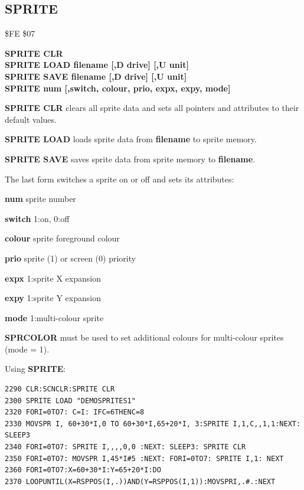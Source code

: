 \subsection{SPRITE}
\begin{description}[leftmargin=2cm,style=nextline]
\item [Token:] \$FE \$07
\item [Format:] {\bf SPRITE CLR} \\
                {\bf SPRITE LOAD filename [,D drive] [,U unit]} \\
                {\bf SPRITE SAVE filename [,D drive] [,U unit]} \\
                {\bf SPRITE num [,switch, colour, prio, expx, expy, mode]}
\item [Usage:]  {\bf SPRITE CLR} clears all sprite data and sets all pointers
                and attributes to their default values.

                {\bf SPRITE LOAD } loads sprite data from {\bf filename}
                to sprite memory.

                {\bf SPRITE SAVE } saves sprite data from
                sprite memory to {\bf filename}.

                \filenamedefinition

                The last form switches a sprite on or off and sets its attributes:

                {\bf num} sprite number

                {\bf switch} 1:on, 0:off

                {\bf colour} sprite foreground colour

                {\bf prio} sprite (1) or screen (0) priority

                {\bf expx} 1:sprite X expansion

                {\bf expy} 1:sprite Y expansion

                {\bf mode} 1:multi-colour sprite

\item [Remarks:] {\bf SPRCOLOR} must be used to set
                additional colours
                for multi-colour sprites (mode = 1).

\item [Example:] Using {\bf SPRITE}:
\begin{tcolorbox}[colback=black,coltext=white]
\verbatimfont{\codefont}
\begin{verbatim}
2290 CLR:SCNCLR:SPRITE CLR
2300 SPRITE LOAD "DEMOSPRITES1"
2320 FORI=0TO7: C=I: IFC=6THENC=8
2330 MOVSPR I, 60+30*I,0 TO 60+30*I,65+20*I, 3:SPRITE I,1,C,,1,1:NEXT: SLEEP3
2340 FORI=0TO7: SPRITE I,,,,0,0 :NEXT: SLEEP3: SPRITE CLR
2350 FORI=0TO7: MOVSPR I,45*I#5 :NEXT: FORI=0TO7: SPRITE I,1: NEXT
2360 FORI=0TO7:X=60+30*I:Y=65+20*I:DO
2370 LOOPUNTIL(X=RSPPOS(I,.))AND(Y=RSPPOS(I,1)):MOVSPRI,.#.:NEXT
\end{verbatim}
\end{tcolorbox}
\end{description}

